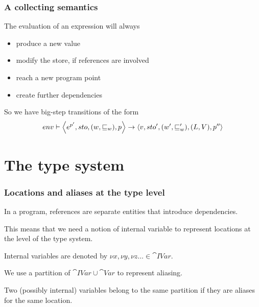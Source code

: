 \documentclass{beamer}
\begin{document}


\begin{frame}
\frametitle{A collecting semantics}

The evaluation of an expression will always

\begin{itemize}
\item produce a new value
\item modify the store, if references are involved
\item reach a new program point
\item create further dependencies
\end{itemize}

So we have big-step transitions of the form
%
\begin{align*}
env\vdash\left\langle e^{p'},sto,(w,\sqsubseteq_w),p\right\rangle\rightarrow\left\langle v,sto',(w',\sqsubseteq_w'),(L,V),p''\right\rangle
\end{align*}

\end{frame}



 \section{The type system}

 \begin{frame}
   \frametitle{Locations and aliases at the type level}

In a program, references are separate entities that introduce
dependencies.

This means that we need a notion of \alert{internal variable} to
represent locations at the level of the type system.

Internal variables are denoted by
$\nu x,\nu y, \nu z \ldots \in\cat{IVar}$.

We use a partition of $\cat{IVar} \cup \cat{Var}$ to represent
aliasing.

Two (possibly internal) variables belong to the same partition if they are
aliases for the same location.

\end{frame}
\end{document}
